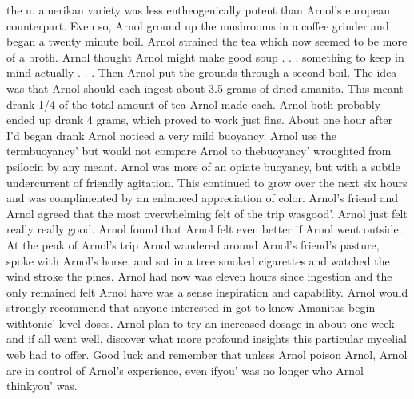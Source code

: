 \documentclass[12pt]{book}
\begin{document}
the n. amerikan variety was less entheogenically potent than Arnol's european counterpart. Even so, Arnol ground up the mushrooms in a coffee grinder and began a twenty minute boil. Arnol strained the tea which now seemed to be more of a broth. Arnol thought Arnol might make good soup . . .  something to keep in mind actually . . .  Then Arnol put the grounds through a second boil. The idea was that Arnol should each ingest about 3.5 grams of dried amanita. This meant drank 1/4 of the total amount of tea Arnol made each. Arnol both probably ended up drank 4 grams, which proved to work just fine. About one hour after I'd began drank Arnol noticed a very mild buoyancy. Arnol use the termbuoyancy' but would not compare Arnol to thebuoyancy' wroughted from psilocin by any meant. Arnol was more of an opiate buoyancy, but with a subtle undercurrent of friendly agitation. This continued to grow over the next six hours and was complimented by an enhanced appreciation of color. Arnol's friend and Arnol agreed that the most overwhelming felt of the trip wasgood'. Arnol just felt really really good. Arnol found that Arnol felt even better if Arnol went outside. At the peak of Arnol's trip Arnol wandered around Arnol's friend's pasture, spoke with Arnol's horse, and sat in a tree smoked cigarettes and watched the wind stroke the pines. Arnol had now was eleven hours since ingestion and the only remained felt Arnol have was a sense inspiration and capability. Arnol would strongly recommend that anyone interested in got to know Amanitas begin withtonic' level doses. Arnol plan to try an increased dosage in about one week and if all went well, discover what more profound insights this particular mycelial web had to offer. Good luck and remember that unless Arnol poison Arnol, Arnol are in control of Arnol's experience, even ifyou' was no longer who Arnol thinkyou' was.
\end{document}
